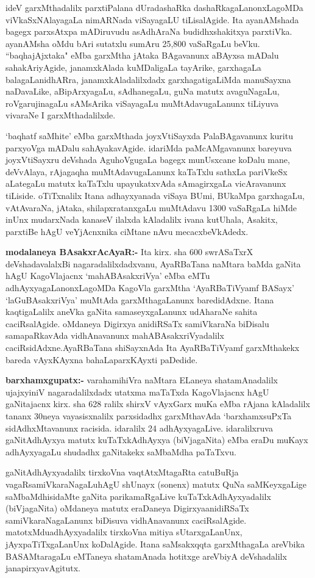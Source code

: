ideV garxMthadalilx parxtiPalana dUradashaRka dashaRkagaLanonxLagoMDa viVkaSxNAlayagaLa nimARNada viSayagaLU tiLisalAgide. Ita ayanAMshada bagegx parxsAtxpa mADiruvudu asAdhAraNa budidhxshakitxya parxtiVka. ayanAMsha oMdu bAri sutatxlu sumAru {\rm 25,800} vaSaRgaLu beVku. ``baqhajAjxtaka" eMba garxMtha jAtaka BAgavanunx aBAyxsa mADalu sahakAriyAgide, janamxkAlada kuMDaligaLa tayArike, garxhagaLa balagaLa\break nidhARra, janamxkAladalilxdadx garxhagatigaLiMda manuSayxna naDavaLike, aBipArxyagaLu, sAdhane\-gaLu, guNa matutx avaguNagaLu, roVgarujinagaLu sAMsArika viSayagaLu muMtAda\-vugaLanunx tiLiyuva vivaraNe I garxMthadalilxde.

`baqhatf saMhite' eMba garxMthada joyxVtiSayxda PalaBAgavanunx kuritu parxyoVga mADalu sahAyakavAgide. idariMda paMcAMgavanunx bareyuva joyxVtiSayxru deVshada AguhoVgugaLa bagegx munUsxcane koDalu mane, deVvAlaya, rAjagaqha muMtAdavugaLanunx kaTaTxlu sathxLa pariVkeSx aLategaLu matutx kaTaTxlu upayukatxvAda sAmagirxgaLa vicAravanunx tiLiside. oTiTxnalilx Itana adhayxyanada viSaya BUmi, BUkaMpa garxhagaLu, vAtAvaraNa, jAtaka, shilapxratanxgaLu muMtAdavu {\rm 1300} vaSaRgaLa hiMde inUnx mudarxNada kanaseV ilalxda kAladalilx ivana kutUhala, Asakitx, parxtiBe hAgU veYjAcnxnika ciMtane nAvu mecacxbeVkAdedx.

\textbf{modalaneya BAsakxrAcAyaR:-} Ita kirx. sha {\rm 600} swrASaTxrX deVshadavalalxBi nagara\-dalilxdadxvanu, AyaRBaTana naMtara baMda gaNita hAgU  KagoVlajacnx `mahABAsakxriVya' eMba eMTu adhAyxyagaLanonxLagoMDa KagoVla garxMtha `AyaRBaTiVyamf BASayx' `laGuBAsakxriVya' muMtAda garxMthagaLanunx baredidAdxne. Itana kaqtigaLalilx aneVka gaNita samaseyxgaLanunx udAharaNe sahita caciRsalAgide. oMdaneya Digirxya anidiRSaTx samiV\-karaNa biDisalu samapaRkavAda vidhAnavanunx mahABAsakxriVyadalilx caciRsidAdxne.\break AyaRBaTana shiSayxnAda Ita AyaRBaTiVyamf garxMthakekx bareda vAyxKAyxna bahaLa\break parxKAyxti paDedide. 

\textbf{barxhamxgupatx:-} varahamihiVra naMtara ELaneya shatamAnadalilx ujajxyiniV nagaradalilxdadx utatxma maTaTxda KagoVlajacnx hAgU gaNitajacnx kirx. sha {\rm 628} ralilx shirxV vAyxGarx muKa eMba rAjana kAladalilx tananx {\rm 30}neya vayasisxnalilx parxsidadhx garxMthavAda `barxhamxsuPxTa sidAdhxMtavanunx racisida. idaralilx {\rm 24} adhAyxyagaLive. idaralilxruva gaNitAdhAyxya matutx kuTaTxkAdhAyxya (biVjagaNita) eMba eraDu muKayx adhAyxyagaLu shudadhx gaNitakekx saMbaMdha paTaTxvu.

gaNitAdhAyxyadalilx tirxkoVna vaqtAtxMtagaRta catuBuRja vagaRsamiVkaraNagaLu\break hAgU shUnayx (sonenx) matutx QuNa saMKeyxgaLige saMbaMdhisidaMte gaNita parikamaRgaLive kuTaTxkAdhAyxyadalilx (biVjagaNita) oMdaneya matutx eraDaneya Digirxya\break anidiRSaTx samiVkaraNagaLanunx biDisuva vidhAnavanunx caciRsalAgide. matotxMdu\break adhAyxyadalilx tirxkoVna mitiya sUtarxgaLanUnx, jAyxpaTiTxgaLanUnx koDalAgide. Itana saMsakxqqta garxMthagaLa areVbika BASAMtaragaLu eMTaneya shatamAnada hotitxge areVbiyA deVshadalilx janapirxyavAgitutx.

